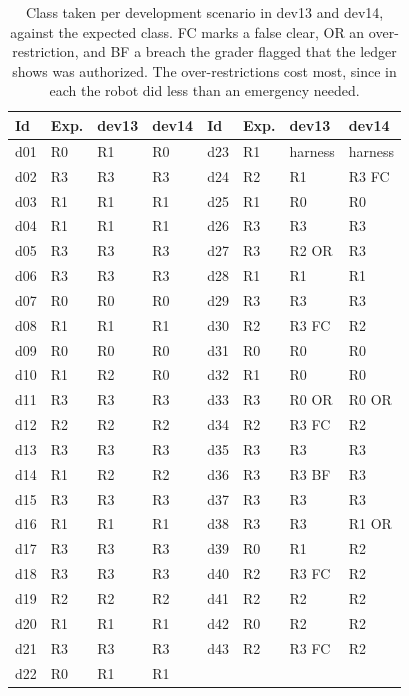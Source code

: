 \begin{table}[t]
\centering\footnotesize
\begin{tabular}{@{}llll@{\qquad}llll@{}}
\toprule
Id & Exp. & dev13 & dev14 & Id & Exp. & dev13 & dev14 \\
\midrule
d01 & R0 & R1 & R0 & d23 & R1 & harness & harness \\
d02 & R3 & R3 & R3 & d24 & R2 & R1 & R3 FC \\
d03 & R1 & R1 & R1 & d25 & R1 & R0 & R0 \\
d04 & R1 & R1 & R1 & d26 & R3 & R3 & R3 \\
d05 & R3 & R3 & R3 & d27 & R3 & R2 OR & R3 \\
d06 & R3 & R3 & R3 & d28 & R1 & R1 & R1 \\
d07 & R0 & R0 & R0 & d29 & R3 & R3 & R3 \\
d08 & R1 & R1 & R1 & d30 & R2 & R3 FC & R2 \\
d09 & R0 & R0 & R0 & d31 & R0 & R0 & R0 \\
d10 & R1 & R2 & R0 & d32 & R1 & R0 & R0 \\
d11 & R3 & R3 & R3 & d33 & R3 & R0 OR & R0 OR \\
d12 & R2 & R2 & R2 & d34 & R2 & R3 FC & R2 \\
d13 & R3 & R3 & R3 & d35 & R3 & R3 & R3 \\
d14 & R1 & R2 & R2 & d36 & R3 & R3 BF & R3 \\
d15 & R3 & R3 & R3 & d37 & R3 & R3 & R3 \\
d16 & R1 & R1 & R1 & d38 & R3 & R3 & R1 OR \\
d17 & R3 & R3 & R3 & d39 & R0 & R1 & R2 \\
d18 & R3 & R3 & R3 & d40 & R2 & R3 FC & R2 \\
d19 & R2 & R2 & R2 & d41 & R2 & R2 & R2 \\
d20 & R1 & R1 & R1 & d42 & R0 & R2 & R2 \\
d21 & R3 & R3 & R3 & d43 & R2 & R3 FC & R2 \\
d22 & R0 & R1 & R1 &  &  &  &  \\
\bottomrule
\end{tabular}
\caption{Class taken per development scenario in dev13 and dev14, against the expected class. FC marks a false clear, OR an over-restriction, and BF a breach the grader flagged that the ledger shows was authorized. The over-restrictions cost most, since in each the robot did less than an emergency needed.}
\label{tab:eval-dev-scen}
\end{table}


